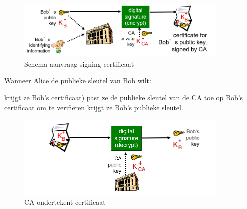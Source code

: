 \begin{figure}[h]
    \centering
    \includegraphics[width=4in]{./img/imghfdst8/hfdst8puntje11.png}
    \caption{Schema aanvraag signing certificaat  }      
    \label{fig:Schema aanvraag signing certificaat }
\end{figure}

\noindent Wanneer Alice de publieke sleutel van Bob wilt:

\bi
\itf krijgt ze Bob’s certificaat)
\itf past ze de publieke sleutel van de CA toe op Bob’s certificaat om te verifiëren
\itf krijgt ze Bob’s publieke sleutel. 
\ei

\begin{figure}[h]
    \centering
\includegraphics[width=4in]{./img/imghfdst8/hfdst8puntje12.png}
\caption{CA ondertekent certificaat }      
    \label{fig:CA ondertekent certificaat }
\end{figure}